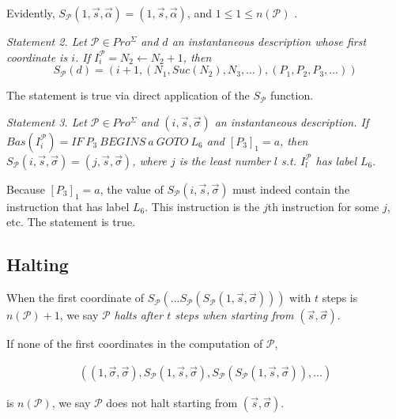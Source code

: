 \documentclass[a4paper, 12pt]{article}
\begin{document}
Evidently, $S_{\mathcal{P}}(1, \overrightarrow{s}, \overrightarrow{\alpha}) =
(1, \overrightarrow{s}, \overrightarrow{\alpha})$, and $1 \leq 1 \leq
n(\mathcal{P})$ .

\textit{Statement 2. Let $\mathcal{P} \in Pro^{\Sigma}$ and $d$ an instantaneous
description whose first coordinate is $i$. If $I_i^{\mathcal{P}} = N_2
\leftarrow N_2 + 1$, then $$S_{\mathcal{P}}(d) = \left( i+1, \left( N_1,
Suc(N_2), N_3, \ldots \right), (P_1, P_2, P_3, \ldots)  \right) $$}

The statement is true via direct application of the $S_{\mathcal{P}}$ function.

\textit{Statement 3. Let $\mathcal{P} \in Pro^{\Sigma}$ and $(i,
\overrightarrow{s}, \overrightarrow{\sigma})$ an instantaneous description. If
$Bas(I_i^{\mathcal{P}}) = IF ~ P_3 ~ BEGINS ~ a ~ GOTO ~ L_6$ and $[P_3]_1 = a$,
then $S_{\mathcal{P}}(i, \overrightarrow{s}, \overrightarrow{\sigma}) = (j,
\overrightarrow{s}, \overrightarrow{\sigma})$, where $j$ is the least number $l$
s.t. $I_{l}^{\mathcal{P}}$ has label $L_6$}.

Because $[P_3]_1 = a$, the value of $S_{\mathcal{P}}(i, \overrightarrow{s},
\overrightarrow{\sigma})$ must indeed contain the instruction that has label
$L_6$. This instruction is the $j$th instruction for some $j$, etc. The
statement is true.

\subsection{Halting}

When the first coordinate of  $S_{\mathcal{P}} \left( \ldots S_{\mathcal{P}}
\left( S_{\mathcal{P}}\left( 1, \overrightarrow{s}, \overrightarrow{\sigma}
\right)\right)  \right) $ with $t$ steps is $n(\mathcal{P}) + 1$, we say
$\mathcal{P}$ \textit{halts after $t$ steps when starting from
$(\overrightarrow{s}, \overrightarrow{\sigma})$}.

If none of the first coordinates in the computation of $\mathcal{P}$, 

\begin{align*}
    \left(  (1, \overrightarrow{\sigma}, \overrightarrow{\sigma}),
    S_{\mathcal{P}}\left( 1, \overrightarrow{s}, \overrightarrow{\sigma}
\right), S_{\mathcal{P}} \left( S_{\mathcal{P}} \left( 1, \overrightarrow{s},
\overrightarrow{\sigma} \right)  \right), \ldots   \right) 
\end{align*}

is $n(\mathcal{P})$, we say $\mathcal{P}$ does not halt starting from
$(\overrightarrow{s}, \overrightarrow{\sigma})$.
\end{document}
